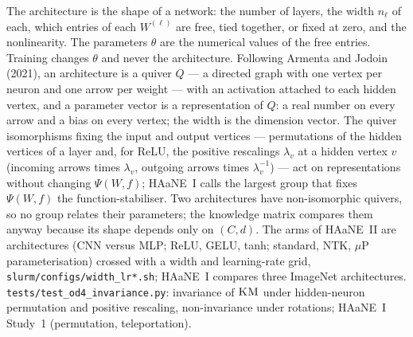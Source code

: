 {The architecture is the shape of a network: the number of layers, the width $n_\ell$ of each, which entries of each $W^{(\ell)}$ are free, tied together, or fixed at zero, and the nonlinearity. The parameters $\theta$ are the numerical values of the free entries. Training changes $\theta$ and never the architecture.}
{Following Armenta and Jodoin (2021), an architecture is a quiver $Q$ --- a directed graph with one vertex per neuron and one arrow per weight --- with an activation attached to each hidden vertex, and a parameter vector is a representation of $Q$: a real number on every arrow and a bias on every vertex; the width is the dimension vector. The quiver isomorphisms fixing the input and output vertices --- permutations of the hidden vertices of a layer and, for ReLU, the positive rescalings $\lambda_v$ at a hidden vertex $v$ (incoming arrows times $\lambda_v$, outgoing arrows times $\lambda_v^{-1}$) --- act on representations without changing $\Psi(W\!,f)$; HAaNE~I calls the largest group that fixes $\Psi(W\!,f)$ the function-stabiliser. Two architectures have non-isomorphic quivers, so no group relates their parameters; the knowledge matrix compares them anyway because its shape depends only on $(C,d)$.}
{The arms of HAaNE~II are architectures (CNN versus MLP; ReLU, GELU, tanh; standard, NTK, $\mu$P parameterisation) crossed with a width and learning-rate grid, \texttt{slurm/configs/width\_lr*.sh}; HAaNE~I compares three ImageNet architectures.}
{\texttt{tests/test\_od4\_invariance.py}: invariance of $\textsc{KM}$ under hidden-neuron permutation and positive rescaling, non-invariance under rotations; HAaNE~I Study~1 (permutation, teleportation).}
